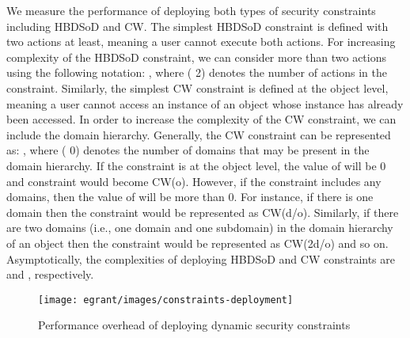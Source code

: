 \documentclass[epsfig,a4paper,11pt,titlepage]{book}
\numberwithin{algorithm}{chapter}
\begin{document}
We measure the performance of deploying both types of security constraints including \gls{HBDSoD} and \gls{CW}. The simplest \gls{HBDSoD} constraint is defined with two actions at least, meaning a user cannot execute both actions. For increasing complexity of the \gls{HBDSoD} constraint, we can consider more than two actions using the following notation: , where  ( 2) denotes the number of actions in the constraint. Similarly, the simplest \gls{CW} constraint is defined at the object level, meaning a user cannot access an instance of an object whose instance has already been accessed. In order to increase the complexity of the \gls{CW} constraint, we can include the domain hierarchy. Generally, the \gls{CW} constraint can be represented as: , where  ( 0) denotes the number of domains that may be present in the domain hierarchy. If the constraint is at the object level, the value of  will be 0 and constraint would become \gls{CW}(o). However, if the constraint includes any domains, then the value of  will be more than 0. For instance, if there is one domain then the constraint would be represented as \gls{CW}(d/o). Similarly, if there are two domains (i.e., one domain and one subdomain) in the domain hierarchy of an object then the constraint would be represented as \gls{CW}(2d/o) and so on. Asymptotically, the complexities of deploying \gls{HBDSoD} and \gls{CW} constraints are  and , respectively.


\begin{figure} [htp]
\centering
\texttt{[image: egrant/images/constraints-deployment]}
\caption{Performance overhead of deploying dynamic security constraints}
\label{fig:egrant-constraints-deployment}
\end{figure}
\end{document}
